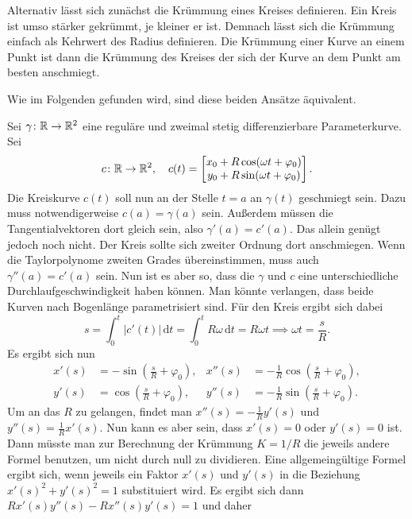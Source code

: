 Alternativ lässt sich zunächst die Krümmung eines Kreises definieren.
Ein Kreis ist umso stärker gekrümmt, je kleiner er ist. Demnach lässt
sich die Krümmung einfach als Kehrwert des Radius definieren. Die
Krümmung einer Kurve an einem Punkt ist dann die Krümmung des Kreises
der sich der Kurve an dem Punkt am besten anschmiegt.

Wie im Folgenden gefunden wird, sind diese beiden Ansätze äquivalent.

Sei $\gamma\colon\mathbb R\to\mathbb R^2$ eine reguläre und zweimal stetig
differenzierbare Parameterkurve. Sei
\begin{equation}
c\colon\mathbb R\to\mathbb R^2,\quad c(t)=\begin{bmatrix}
x_0+R\cos(\omega t+\varphi_0)\\
y_0+R\sin(\omega t+\varphi_0)
\end{bmatrix}.
\end{equation}
Die Kreiskurve $c(t)$ soll nun an der Stelle $t=a$ an $\gamma(t)$
geschmiegt sein. Dazu muss notwendigerweise $c(a)=\gamma(a)$ sein.
Außerdem müssen die Tangentialvektoren dort gleich sein, also
$\gamma'(a) = c'(a)$. Das allein genügt jedoch noch nicht. Der
Kreis sollte sich zweiter Ordnung dort anschmiegen. Wenn die
Taylorpolynome zweiten Grades übereinstimmen, muss auch
$\gamma''(a) = c'(a)$ sein. Nun ist es aber so, dass die $\gamma$
und $c$ eine unterschiedliche Durchlaufgeschwindigkeit haben können.
Man könnte verlangen, dass beide Kurven nach Bogenlänge parametrisiert
sind. Für den Kreis ergibt sich dabei
\begin{equation}
s = \int_0^t |c'(t)|\,\mathrm dt = \int_0^t R\omega\,\mathrm dt
= R\omega t \implies \omega t = \frac{s}{R}.
\end{equation}
Es ergibt sich nun
\begin{align}
x'(s) &= -\sin(\tfrac{s}{R}+\varphi_0),
& x''(s) &= -\tfrac{1}{R}\cos(\tfrac{s}{R}+\varphi_0),\\
y'(s) &= \cos(\tfrac{s}{R}+\varphi_0),
& y''(s) &= -\tfrac{1}{R}\sin(\tfrac{s}{R}+\varphi_0).
\end{align}
Um an das $R$ zu gelangen, findet man $x''(s)=-\tfrac{1}{R}y'(s)$
und $y''(s)=\tfrac{1}{R}x'(s)$. Nun kann es aber sein, dass
$x'(s)=0$ oder $y'(s)=0$ ist. Dann müsste man zur Berechnung der
Krümmung $K = 1/R$ die jeweils andere Formel benutzen, um
nicht durch null zu dividieren. Eine allgemeingültige Formel
ergibt sich, wenn jeweils ein Faktor $x'(s)$ und $y'(s)$ in
die Beziehung $x'(s)^2+y'(s)^2=1$ substituiert wird. Es ergibt
sich dann $Rx'(s)y''(s)-Rx''(s)y'(s)=1$ und daher
